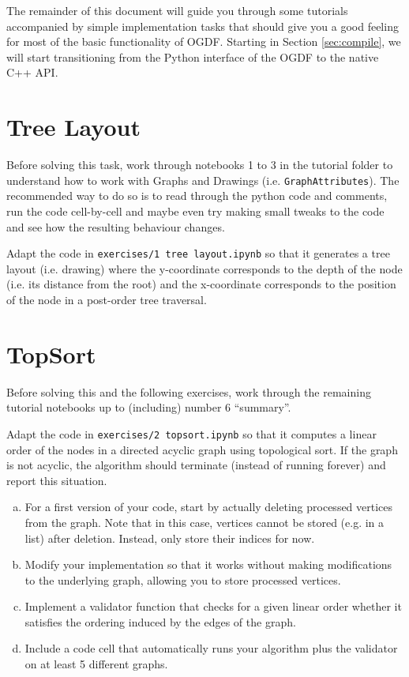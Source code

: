 \documentclass{article}
\begin{document}
The remainder of this document will guide you through some tutorials accompanied by simple implementation tasks that should give you a good feeling for most of the basic functionality of OGDF.
Starting in Section \ref{sec:compile}, we will start transitioning from the Python interface of the OGDF to the native C++ API.


\section{Tree Layout}
Before solving this task, work through notebooks 1 to 3 in the tutorial folder to understand how to work with Graphs and Drawings (i.e. \texttt{GraphAttributes}).
The recommended way to do so is to read through the python code and comments, run the code cell-by-cell and maybe even try making small tweaks to the code and see how the resulting behaviour changes.

Adapt the code in \texttt{exercises/1 tree layout.ipynb} so that it generates a tree layout (i.e. drawing) where the
y-coordinate corresponds to the depth of the node (i.e. its distance from the root) and the
x-coordinate corresponds to the position of the node in a post-order tree traversal.

\section{TopSort}
Before solving this and the following exercises, work through the remaining tutorial notebooks up to (including) number 6 ``summary''.

Adapt the code in \texttt{exercises/2 topsort.ipynb} so that it computes a linear order of the nodes in a directed acyclic graph using topological sort.
If the graph is not acyclic, the algorithm should terminate (instead of running forever) and report this situation.
\begin{enumerate}[a)]
\item For a first version of your code, start by actually deleting processed vertices from the graph.
  Note that in this case, vertices cannot be stored (e.g. in a list) after deletion.
  Instead, only store their indices for now.
\item Modify your implementation so that it works without making modifications to the underlying graph, allowing you to store processed vertices.
\item Implement a validator function that checks for a given linear order whether it satisfies the ordering induced by the edges of the graph.
\item Include a code cell that automatically runs your algorithm plus the validator on at least 5 different graphs.
\end{enumerate}
\end{document}
